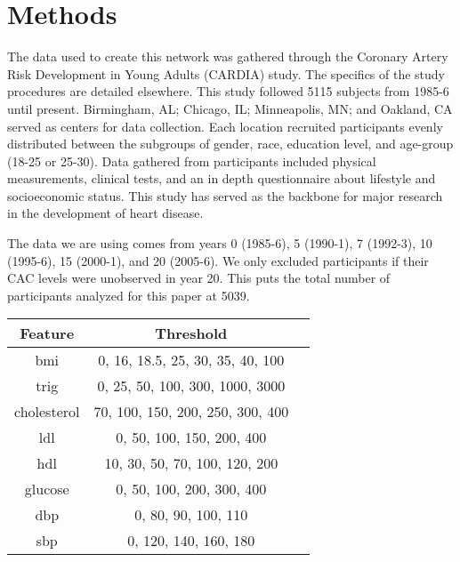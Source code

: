 \section{Methods}

The data used to create this network was gathered through the Coronary Artery Risk Development in Young Adults (CARDIA) study. The specifics of the study procedures are detailed elsewhere\cite{Friedman1988}. This study followed 5115 subjects from 1985-6 until present. Birmingham, AL; Chicago, IL; Minneapolis, MN; and Oakland, CA served as centers for data collection. Each location recruited participants evenly distributed between the subgroups of gender, race, education level, and age-group (18-25 or 25-30). Data gathered from participants included physical measurements, clinical tests, and an in depth questionnaire about lifestyle and socioeconomic status. This study has served as the backbone for major research in the development of heart disease.

The data we are using comes from years 0 (1985-6), 5 (1990-1), 7 (1992-3), 10 (1995-6), 15 (2000-1), and 20 (2005-6). We only excluded participants if their CAC levels were unobserved in year 20. This puts the total number of participants analyzed for this paper at 5039. 

\begin{table}{}
\centering
\begin{tabular}{ |c|c|c| } 
 \hline
 Feature & Threshold\\ 
 \hline
 bmi & 0, 16, 18.5, 25, 30, 35, 40, 100\\
 \hline
 trig & 0, 25, 50, 100, 300, 1000, 3000\\
 \hline
 cholesterol & 70, 100, 150, 200, 250, 300, 400\\
 \hline
 ldl & 0, 50, 100, 150, 200, 400\\
 \hline
 hdl & 10, 30, 50, 70, 100, 120, 200\\
 \hline
 glucose & 0, 50, 100, 200, 300, 400\\
 \hline
 dbp & 0, 80, 90, 100, 110\\ 
 \hline
 sbp & 0, 120, 140, 160, 180\\ 
 
 \hline
\end{tabular}
\end{table}
 
